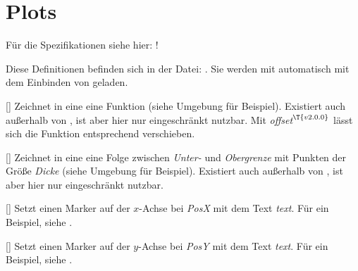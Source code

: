 \section{Plots \tiny{}}
\begin{center}
    Für die Spezifikationen siehe hier: !
\end{center}
Diese Definitionen befinden sich in der Datei: . Sie werden mit  automatisch mit dem Einbinden von  geladen.

%
%
%

[]
Zeichnet in eine  eine Funktion (siehe Umgebung für Beispiel). Existiert auch außerhalb von , ist aber hier nur eingeschränkt nutzbar. Mit \emph{offset}${}^{\T{v2.0.0}}$ lässt sich die Funktion entsprechend verschieben.

%
%
%

[\secline{}]
Zeichnet in eine  eine Folge zwischen \emph{Unter-} und \emph{Obergrenze} mit Punkten der Größe \emph{Dicke} (siehe Umgebung für Beispiel). Existiert auch außerhalb von , ist aber hier nur eingeschränkt nutzbar.

%
%
%

[]
Setzt einen Marker auf der $x$-Achse bei \emph{PosX} mit dem Text \emph{text}. Für ein Beispiel, siehe .

%
%
%

[]
Setzt einen Marker auf der $y$-Achse bei \emph{PosY} mit dem Text \emph{text}. Für ein Beispiel, siehe .

%
%
%
%
%
%

